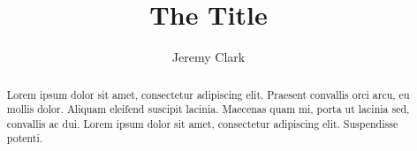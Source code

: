 \documentclass[letterpaper,UKenglish,anonymous]{lipics-v2021}
\title{The Title}
\author{Jeremy Clark}{Concordia, Canada \and \url{https://www.pulpspy.com} }{pulpspy@gmail.com}{https://orcid.org/0000-0002-3533-5965}{Funding acknowledgements}
\begin{document}
\maketitle

\begin{abstract}
Lorem ipsum dolor sit amet, consectetur adipiscing elit. Praesent convallis orci arcu, eu mollis dolor. Aliquam eleifend suscipit lacinia. Maecenas quam mi, porta ut lacinia sed, convallis ac dui. Lorem ipsum dolor sit amet, consectetur adipiscing elit. Suspendisse potenti. 
\end{abstract}







\end{document}
